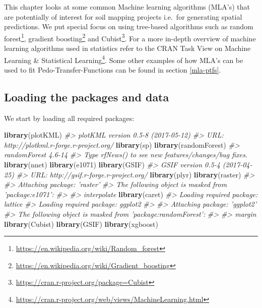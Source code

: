 \documentclass[graybox,natbib,nospthms,UStrade]{svmono}
\newenvironment{Shaded}{\begin{snugshade}}{\end{snugshade}}
\newcommand{\CommentTok}[1]{\textcolor[rgb]{0.37,0.37,0.37}{\textit{#1}}}
\newcommand{\KeywordTok}[1]{\textcolor[rgb]{0.27,0.27,0.27}{\textbf{#1}}}
\newcommand{\NormalTok}[1]{#1}
\renewcommand{\href}[2]{#2 (\url{#1})}
\renewcommand{\href}[2]{#2\footnote{\url{#1}}}
\begin{document}
This chapter looks at some common Machine learning algorithms (MLA's) that are potentially of interest for soil mapping projects i.e.~for generating spatial predictions. We put special focus on using tree-based algorithms such as \href{https://en.wikipedia.org/wiki/Random_forest}{random forest}, \href{https://en.wikipedia.org/wiki/Gradient_boosting}{gradient boosting} and \href{https://cran.r-project.org/package=Cubist}{Cubist}. For a more in-depth overview of machine learning algorithms used in statistics refer to the CRAN Task View on \href{https://cran.r-project.org/web/views/MachineLearning.html}{Machine Learning \& Statistical Learning}. Some other examples of how MLA's can be used to fit Pedo-Transfer-Functions can be found in section \ref{mla-ptfs}.

\hypertarget{loading-the-packages-and-data}{%
\subsection{Loading the packages and data}\label{loading-the-packages-and-data}}

We start by loading all required packages:

\begin{Shaded}
\begin{Highlighting}[]
\KeywordTok{library}\NormalTok{(plotKML)}
\CommentTok{#> plotKML version 0.5-8 (2017-05-12)}
\CommentTok{#> URL: http://plotkml.r-forge.r-project.org/}
\KeywordTok{library}\NormalTok{(sp)}
\KeywordTok{library}\NormalTok{(randomForest)}
\CommentTok{#> randomForest 4.6-14}
\CommentTok{#> Type rfNews() to see new features/changes/bug fixes.}
\KeywordTok{library}\NormalTok{(nnet)}
\KeywordTok{library}\NormalTok{(e1071)}
\KeywordTok{library}\NormalTok{(GSIF)}
\CommentTok{#> GSIF version 0.5-4 (2017-04-25)}
\CommentTok{#> URL: http://gsif.r-forge.r-project.org/}
\KeywordTok{library}\NormalTok{(plyr)}
\KeywordTok{library}\NormalTok{(raster)}
\CommentTok{#> }
\CommentTok{#> Attaching package: 'raster'}
\CommentTok{#> The following object is masked from 'package:e1071':}
\CommentTok{#> }
\CommentTok{#>     interpolate}
\KeywordTok{library}\NormalTok{(caret)}
\CommentTok{#> Loading required package: lattice}
\CommentTok{#> Loading required package: ggplot2}
\CommentTok{#> }
\CommentTok{#> Attaching package: 'ggplot2'}
\CommentTok{#> The following object is masked from 'package:randomForest':}
\CommentTok{#> }
\CommentTok{#>     margin}
\KeywordTok{library}\NormalTok{(Cubist)}
\KeywordTok{library}\NormalTok{(GSIF)}
\KeywordTok{library}\NormalTok{(xgboost)}
\end{Highlighting}
\end{Shaded}
\end{document}
